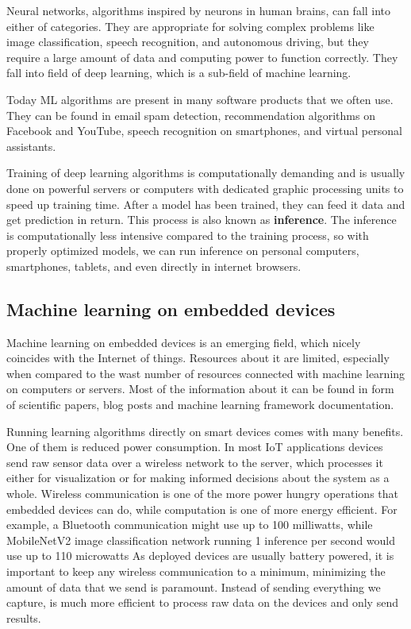 Neural networks, algorithms inspired by neurons in human brains\cite{geron}\cite{cs231n}, can fall into either of categories. 
They are appropriate for solving complex problems like image classification, speech recognition, and autonomous driving, but they require a large amount of data and computing power to function correctly.
They fall into field of deep learning, which is a sub-field of machine learning.

Today ML algorithms are present in many software products that we often use. 
They can be found in email spam detection, recommendation algorithms on Facebook and YouTube, speech recognition on smartphones, and virtual personal assistants. 

Training of deep learning algorithms is computationally demanding and is usually done on powerful servers or computers with dedicated graphic processing units to speed up training time.
After a model has been trained, they can feed it data and get prediction in return. 
This process is also known as \textbf{inference}.
The inference is computationally less intensive compared to the training process, so with properly optimized models, we can run inference on personal computers, smartphones, tablets, and even directly in internet browsers.


\subsection{ Machine learning on embedded devices}

Machine learning on embedded devices is an emerging field, which nicely coincides with the Internet of things.
Resources about it are limited, especially when compared to the wast number of resources connected with machine learning on computers or servers.
Most of the information about it can be found in form of scientific papers, blog posts and machine learning framework documentation\cite{hello_edge}\cite{tflite_risc-v}\cite{pete_tiny}.

Running learning algorithms directly on smart devices comes with many benefits.
One of them is reduced power consumption.
In most IoT applications devices send raw sensor data over a wireless network to the server, which processes it either for visualization or for making informed decisions about the system as a whole. 
Wireless communication is one of the more power hungry operations that embedded devices can do, while computation is one of more energy efficient\cite{pete_tiny}.
For example, a Bluetooth communication might use up to 100 milliwatts, while MobileNetV2 image classification network running 1 inference per second would use up to 110 microwatts\cite{pete_tiny}
As deployed devices are usually battery powered, it is important to keep any wireless communication to a minimum, minimizing the amount of data that we send is paramount.
Instead of sending everything we capture, is much more efficient to process raw data on the devices and only send results.

